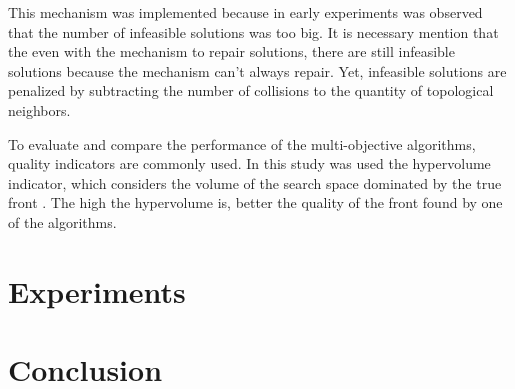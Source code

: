 This mechanism was implemented because in early experiments was observed that the number of infeasible solutions was too big. It is necessary mention that the even with the mechanism to repair solutions, there are still infeasible solutions because the mechanism can't always repair. Yet, infeasible solutions are penalized by subtracting the number of collisions to the quantity of topological neighbors.


To evaluate and compare the performance of the multi-objective algorithms, quality indicators are commonly used. In this study was used the hypervolume indicator, which considers the volume of the search space dominated by the true front \cite{zitzler2003performance}. The high the hypervolume is, better the quality of the front found by one of the algorithms.


\section{Experiments}

\section{Conclusion}